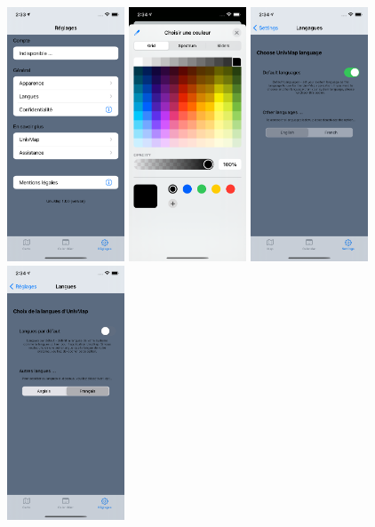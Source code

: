 \documentclass{article}
\begin{document}
\begin{center}
    \includegraphics[width=35mm, scale=0.5]{setting.png}
    \includegraphics[width=35mm, scale=0.5]{setting_appearance.png}
    \includegraphics[width=35mm, scale=0.5]{setting_languageOn.png}
    \includegraphics[width=35mm, scale=0.5]{setting_languageOff.png}
\end{center}
\end{document}
